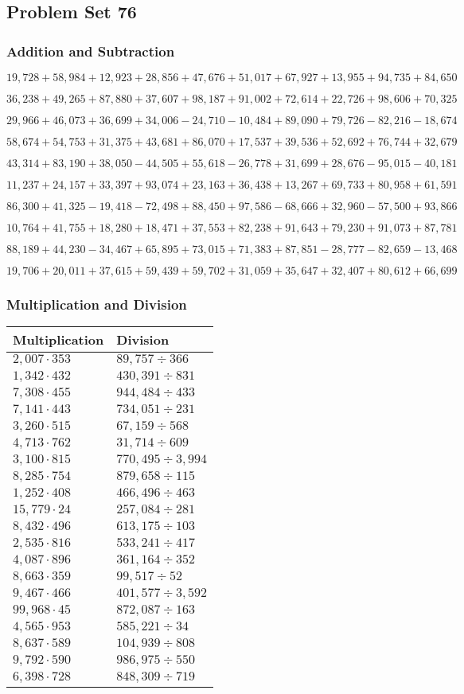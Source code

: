 \hypertarget{problem-set-76}{%
\subsection{Problem Set 76}\label{problem-set-76}}

\hypertarget{addition-and-subtraction-298}{%
\subsubsection{Addition and
Subtraction}\label{addition-and-subtraction-298}}

\(19,728+58,984+12,923+28,856+47,676+51,017+67,927+13,955+94,735+ 84,650\)

\(36,238+49,265+87,880+37,607+98,187+91,002+72,614+22,726+98,606+70,325\)

\(29,966+46,073+36,699+34,006-24,710-10,484+89,090+79,726-82,216-18,674\)

\(58,674+54,753+31,375+43,681+86,070+17,537+39,536+52,692+76,744+32,679\)

\(43,314+83,190+38,050-44,505+55,618-26,778+31,699+28,676-95,015-40,181\)

\(11,237+24,157+33,397+93,074+23,163+36,438+13,267+69,733+80,958+61,591\)

\(86,300+41,325-19,418-72,498+88,450+97,586-68,666+32,960-57,500+93,866\)

\(10,764+41,755+18,280+18,471+37,553+82,238+91,643+79,230+91,073+87,781\)

\(88,189+44,230-34,467+65,895+73,015+71,383+87,851-28,777-82,659-13,468\)

\(19,706+20,011+37,615+59,439+59,702+31,059+35,647+32,407+80,612+66,699\)

\hypertarget{multiplication-and-division-297}{%
\subsubsection{Multiplication and
Division}\label{multiplication-and-division-297}}

\begin{longtable}[]{@{}ll@{}}
\toprule
Multiplication & Division\tabularnewline
\midrule
\endhead
\(2,007\cdot353\) & \(89,757÷366\)\tabularnewline
\(1,342\cdot432\) & \(430,391÷831\)\tabularnewline
\(7,308\cdot455\) & \(944,484÷433\)\tabularnewline
\(7,141\cdot443\) & \(734,051÷231\)\tabularnewline
\(3,260\cdot515\) & \(67,159÷568\)\tabularnewline
\(4,713\cdot762\) & \(31,714÷609\)\tabularnewline
\(3,100\cdot815\) & \(770,495÷3,994\)\tabularnewline
\(8,285\cdot754\) & \(879,658÷115\)\tabularnewline
\(1,252\cdot408\) & \(466,496÷463\)\tabularnewline
\(15,779\cdot24\) & \(257,084÷281\)\tabularnewline
\(8,432\cdot496\) & \(613,175÷103\)\tabularnewline
\(2,535\cdot816\) & \(533,241÷417\)\tabularnewline
\(4,087\cdot896\) & \(361,164÷352\)\tabularnewline
\(8,663\cdot359\) & \(99,517÷52\)\tabularnewline
\(9,467\cdot466\) & \(401,577÷3,592\)\tabularnewline
\(99,968\cdot45\) & \(872,087÷163\)\tabularnewline
\(4,565\cdot953\) & \(585,221÷34\)\tabularnewline
\(8,637\cdot589\) & \(104,939÷808\)\tabularnewline
\(9,792\cdot590\) & \(986,975÷550\)\tabularnewline
\(6,398\cdot728\) & \(848,309÷719\)\tabularnewline
\bottomrule
\end{longtable}

